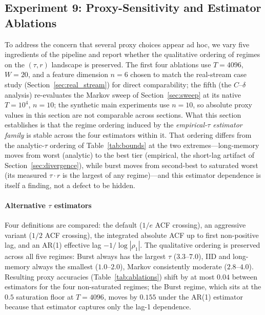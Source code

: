 \documentclass[sensors,article,submit,pdftex,moreauthors]{Definitions/mdpi}
\providecommand{\DIFadd}[1]{{\protect\color{blue}#1}} %
\providecommand{\DIFdel}[1]{} %
\providecommand{\DIFaddbegin}{} %
\providecommand{\DIFaddend}{} %
\providecommand{\DIFdelbegin}{} %
\providecommand{\DIFdelend}{} %
\begin{document}
\subsection{Experiment 9: Proxy-Sensitivity and Estimator Ablations}
\label{sec:ablations}

To address the concern that several proxy choices appear ad hoc, we vary \DIFdelbegin \DIFdel{four }\DIFdelend \DIFaddbegin \DIFadd{five }\DIFaddend ingredients of the pipeline and report whether the qualitative ordering of regimes on the $(\tau, r)$ landscape is preserved. \DIFdelbegin \DIFdel{All }\DIFdelend \DIFaddbegin \DIFadd{The first four }\DIFaddend ablations use $T = 4096$, $W = 20$, and a feature dimension $n = 6$ chosen to match the real-stream case study (Section~\ref{sec:real_stream}) for direct comparability; the \DIFaddbegin \DIFadd{fifth (the $C$--$\delta$ analysis) re-evaluates the Markov sweep of Section~\ref{sec:sweep} at its native $T = 10^{4}$, $n = 10$; the }\DIFaddend synthetic main experiments use $n = 10$, so absolute proxy values in this section are not \DIFdelbegin \DIFdel{directly comparable to those in Sections~\ref{sec:results}--\ref{sec:correlation_char}, but the qualitative regimeordering is }\DIFdelend \DIFaddbegin \DIFadd{comparable across sections. What this section establishes is that the regime ordering induced by the }\emph{\DIFadd{empirical-$\tau$ estimator family}} \DIFadd{is stable across the four estimators within it. That ordering differs from the analytic-$\tau$ ordering of Table~\ref{tab:bounds} at the two extremes---long-memory moves from worst (analytic) to the best tier (empirical, the short-lag artifact of Section~\ref{sec:divergence}), while burst moves from second-best to saturated worst (its measured $\tau \cdot r$ is the largest of any regime)---and this estimator dependence is itself a finding, not a defect to be hidden}\DIFaddend .

\paragraph{Alternative $\tau$ estimators} Four definitions are compared: the default ($1/e$ ACF crossing), an aggressive variant ($1/2$ ACF crossing), the integrated absolute ACF up to first non-positive lag, and an AR(1) effective lag $-1/\log|\rho_1|$. The qualitative ordering is preserved across all five regimes: Burst always has the largest $\tau$ ($3.3$--$7.0$), IID and long-memory always the smallest ($1.0$--$2.0$), Markov consistently moderate ($2.8$--$4.0$). Resulting proxy accuracies (Table~\ref{tab:ablations}) shift by at most $0.04$ between estimators \DIFdelbegin \DIFdel{; the largest shift is in the }\DIFdelend \DIFaddbegin \DIFadd{for the four non-saturated regimes; the }\DIFaddend Burst regime, \DIFdelbegin \DIFdel{where the proxy is in saturation and }\DIFdelend \DIFaddbegin \DIFadd{which sits at the $0.5$ saturation floor at $T = 4096$, moves by $0.155$ under }\DIFaddend the AR(1) estimator \DIFdelbegin \DIFdel{yields a modestly higher value because it }\DIFdelend \DIFaddbegin \DIFadd{because that estimator }\DIFaddend captures only the lag-1 dependence.
\end{document}
